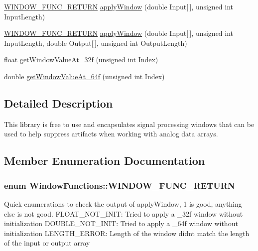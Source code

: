 \begin{DoxyCompactItemize}
\item 
\hyperlink{class_window_functions_a0307e2e5d044d1f81410766ac035fd3f}{W\+I\+N\+D\+O\+W\+\_\+\+F\+U\+N\+C\+\_\+\+R\+E\+T\+U\+RN} \hyperlink{class_window_functions_ab9a60a32334b2c8e7ddbfce810ca29bb}{apply\+Window} (double Input\mbox{[}$\,$\mbox{]}, unsigned int Input\+Length)
\item 
\hyperlink{class_window_functions_a0307e2e5d044d1f81410766ac035fd3f}{W\+I\+N\+D\+O\+W\+\_\+\+F\+U\+N\+C\+\_\+\+R\+E\+T\+U\+RN} \hyperlink{class_window_functions_a14aa6ccc449e8690c44902c18e0cb7bd}{apply\+Window} (double Input\mbox{[}$\,$\mbox{]}, unsigned int Input\+Length, double Output\mbox{[}$\,$\mbox{]}, unsigned int Output\+Length)
\item 
float \hyperlink{class_window_functions_a314a75ca7ee48acbb23c9168141993ad}{get\+Window\+Value\+At\+\_\+32f} (unsigned int Index)
\item 
double \hyperlink{class_window_functions_adc0672a5dccbbb9034238acf27ec7f56}{get\+Window\+Value\+At\+\_\+64f} (unsigned int Index)
\end{DoxyCompactItemize}


\subsection{Detailed Description}
This library is free to use and encapsulates signal processing windows that can be used to help suppress artifacts when working with analog data arrays. 

\subsection{Member Enumeration Documentation}
\subsubsection[{\texorpdfstring{W\+I\+N\+D\+O\+W\+\_\+\+F\+U\+N\+C\+\_\+\+R\+E\+T\+U\+RN}{WINDOW_FUNC_RETURN}}]{\setlength{\rightskip}{0pt plus 5cm}enum {\bf Window\+Functions\+::\+W\+I\+N\+D\+O\+W\+\_\+\+F\+U\+N\+C\+\_\+\+R\+E\+T\+U\+RN}}\hypertarget{class_window_functions_a0307e2e5d044d1f81410766ac035fd3f}{}\label{class_window_functions_a0307e2e5d044d1f81410766ac035fd3f}
Quick enumerations to check the output of apply\+Window, 1 is good, anything else is not good. F\+L\+O\+A\+T\+\_\+\+N\+O\+T\+\_\+\+I\+N\+IT\+: Tried to apply a \+\_\+32f window without initialization D\+O\+U\+B\+L\+E\+\_\+\+N\+O\+T\+\_\+\+I\+N\+IT\+: Tried to apply a \+\_\+64f window without initialization L\+E\+N\+G\+T\+H\+\_\+\+E\+R\+R\+OR\+: Length of the window didn\textquotesingle{}t match the length of the input or output array 

